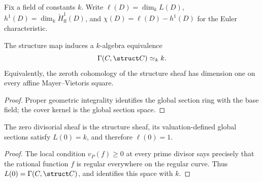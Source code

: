 \begin{definition}
  \label{def:adelic_chi_ledger}
  \leanok
  Fix a field of constants \(k\). Write \(\ell(D) = \dim_k L(D)\),
  \(h^1(D) = \dim_k \check{H}^1_{\mathrm{ff}}(D)\), and
  \(\chi(D) = \ell(D) - h^1(D)\)
  for the Euler characteristic.
\end{definition}

\begin{theorem}
  \label{thm:adelic_global_sections_constants}
  \leanok
  The structure map induces a \(k\)-algebra equivalence
  \[
    \Gamma(C,\struct C)\simeq_k k.
  \]
  Equivalently, the zeroth cohomology of the structure sheaf has dimension
  one on every affine Mayer--Vietoris square.
\end{theorem}
\begin{proof}
  \leanok
  Proper geometric integrality identifies the global section ring with the
  base field; the cover kernel is the global section space.
\end{proof}

\begin{corollary}
  \label{thm:adelic_ell_zero}
  The zero divisorial sheaf is the structure sheaf, its valuation-defined
  global sections satisfy \(L(0)=k\), and therefore \(\ell(0)=1\).
\end{corollary}
\begin{proof}
  The local condition \(v_P(f)\ge0\) at every prime divisor says precisely
  that the rational function \(f\) is regular everywhere on the regular
  curve.  Thus \(L(0)=\Gamma(C,\struct C)\), and
   identifies this space with
  \(k\).
\end{proof}

